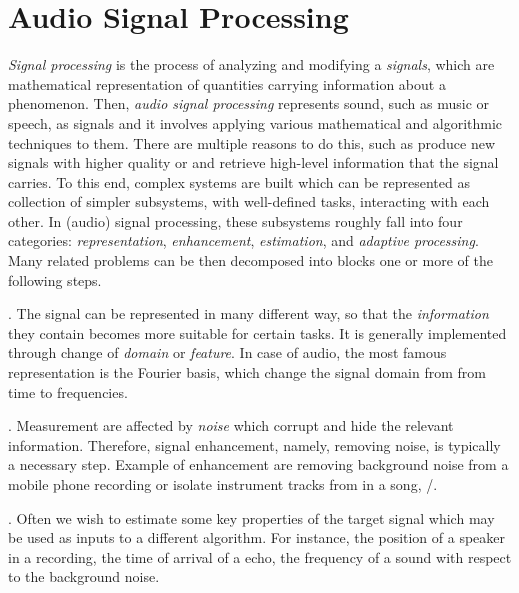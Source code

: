 \section{Audio Signal Processing}\label{sec:intro:processing}
\textit{Signal processing} is the process of analyzing and modifying a \textit{signals}, which are mathematical representation of quantities carrying information about a phenomenon.
Then, \textit{audio signal processing} represents sound, such as music or speech, as signals
 and it involves applying various mathematical and algorithmic techniques to them.
There are multiple reasons to do this, such as produce new signals with higher quality or and retrieve high-level information that the signal carries.
To this end, complex systems are built which can be represented as collection of simpler subsystems, with well-defined tasks, interacting with each other.
In (audio) signal processing, these subsystems roughly fall into four categories: \textit{representation}, \textit{enhancement}, \textit{estimation}, and \textit{adaptive processing}.
Many related problems can be then decomposed into blocks one or more of the following steps.

.
    The signal can be represented in many different way, so that the \textit{information} they contain becomes more suitable for certain tasks.
    It is generally implemented through change of \textit{domain} or \textit{feature}.
    In case of audio, the most famous representation is the Fourier basis, which change the signal domain from from time to frequencies.

.
    Measurement are affected by \textit{noise} which corrupt and hide the relevant information.
    Therefore, signal enhancement, namely, removing noise, is typically a necessary step.
    Example of enhancement are removing background noise from a mobile phone recording or isolate instrument tracks from in a song, \etc/.

.
    Often we wish to estimate some key properties of the target signal which may be used as inputs to a different algorithm.
    For instance, the position of a speaker in a recording, the time of arrival of a echo, the frequency of a sound with respect to the background noise.

